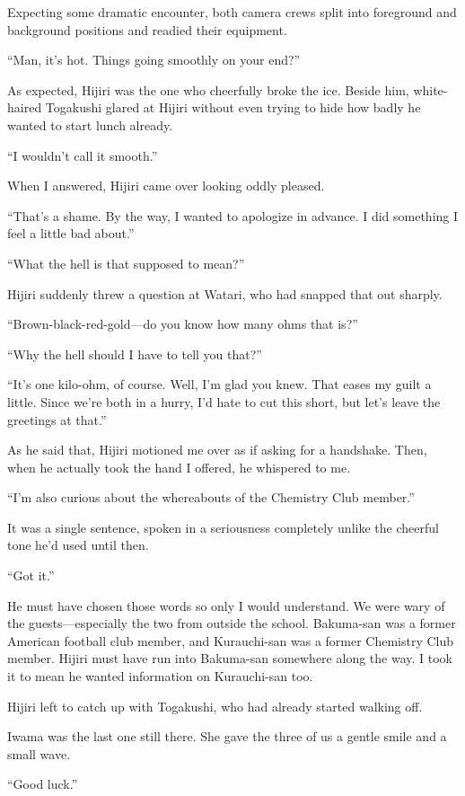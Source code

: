 \documentclass[
    a4paper,
    12pt,
    twoside,
    openany,
    UTF8,
    fontset=windows
]{ctexbook}
\begin{document}
Expecting some dramatic encounter, both camera crews split into foreground and background positions and readied their equipment.

``Man, it's hot. Things going smoothly on your end?''

As expected, Hijiri was the one who cheerfully broke the ice. Beside him, white-haired Togakushi glared at Hijiri without even trying to hide how badly he wanted to start lunch already.

``I wouldn't call it smooth.''

When I answered, Hijiri came over looking oddly pleased.

``That's a shame. By the way, I wanted to apologize in advance. I did something I feel a little bad about.''

``What the hell is that supposed to mean?''

Hijiri suddenly threw a question at Watari, who had snapped that out sharply.

``Brown-black-red-gold---do you know how many ohms that is?''

``Why the hell should I have to tell you that?''

``It's one kilo-ohm, of course. Well, I'm glad you knew. That eases my guilt a little. Since we're both in a hurry, I'd hate to cut this short, but let's leave the greetings at that.''

As he said that, Hijiri motioned me over as if asking for a handshake. Then, when he actually took the hand I offered, he whispered to me.

``I'm also curious about the whereabouts of the Chemistry Club member.''

It was a single sentence, spoken in a seriousness completely unlike the cheerful tone he'd used until then.

``Got it.''

He must have chosen those words so only I would understand. We were wary of the guests---especially the two from outside the school. Bakuma-san was a former American football club member, and Kurauchi-san was a former Chemistry Club member. Hijiri must have run into Bakuma-san somewhere along the way. I took it to mean he wanted information on Kurauchi-san too.

Hijiri left to catch up with Togakushi, who had already started walking off.

Iwama was the last one still there. She gave the three of us a gentle smile and a small wave.

``Good luck.''
\end{document}
